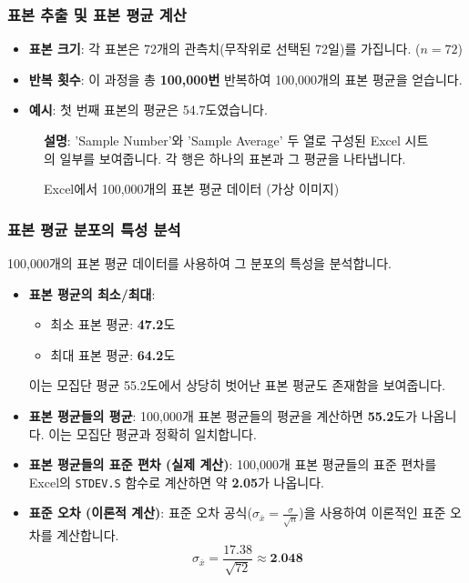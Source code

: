 \documentclass[11pt,a4paper]{book}
\theoremstyle{definition}
\begin{document}
\subsubsection*{표본 추출 및 표본 평균 계산}

\begin{itemize}
    \item \textbf{표본 크기}: 각 표본은 72개의 관측치(무작위로 선택된 72일)를 가집니다. ($n=72$)
    \item \textbf{반복 횟수}: 이 과정을 총 \textbf{100,000번} 반복하여 100,000개의 표본 평균을 얻습니다.
    \item \textbf{예시}: 첫 번째 표본의 평균은 54.7도였습니다.
\end{itemize}

\begin{figure}[h!]
    \centering
    \caption{Excel에서 100,000개의 표본 평균 데이터 (가상 이미지)}
    \label{fig:excel_samples}
    \textbf{설명}: 'Sample Number'와 'Sample Average' 두 열로 구성된 Excel 시트의 일부를 보여줍니다. 각 행은 하나의 표본과 그 평균을 나타냅니다.
\end{figure}

\subsubsection*{표본 평균 분포의 특성 분석}

100,000개의 표본 평균 데이터를 사용하여 그 분포의 특성을 분석합니다.

\begin{itemize}
    \item \textbf{표본 평균의 최소/최대}:
    \begin{itemize}
        \item 최소 표본 평균: \textbf{47.2}도
        \item 최대 표본 평균: \textbf{64.2}도
    \end{itemize}
    이는 모집단 평균 55.2도에서 상당히 벗어난 표본 평균도 존재함을 보여줍니다.
    \item \textbf{표본 평균들의 평균}: 100,000개 표본 평균들의 평균을 계산하면 \textbf{55.2}도가 나옵니다. 이는 모집단 평균과 정확히 일치합니다.
    \item \textbf{표본 평균들의 표준 편차 (실제 계산)}: 100,000개 표본 평균들의 표준 편차를 Excel의 \texttt{STDEV.S} 함수로 계산하면 약 \textbf{2.05}가 나옵니다.
    \item \textbf{표준 오차 (이론적 계산)}: 표준 오차 공식($\sigma_{\bar{x}} = \frac{\sigma}{\sqrt{n}}$)을 사용하여 이론적인 표준 오차를 계산합니다.
    \[ \sigma_{\bar{x}} = \frac{17.38}{\sqrt{72}} \approx \textbf{2.048} \]
\end{itemize}
\end{document}
